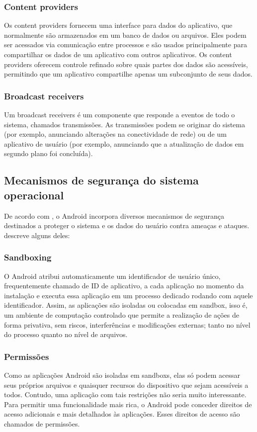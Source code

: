     \subsubsection{Content providers}
    Os content providers fornecem uma interface para dados do aplicativo, que normalmente são armazenados em um banco de dados ou arquivos. Eles podem ser acessados via comunicação entre processos e são usados principalmente para compartilhar os dados de um aplicativo com outros aplicativos. Os content providers oferecem controle refinado sobre quais partes dos dados são acessíveis, permitindo que um aplicativo compartilhe apenas um subconjunto de seus dados.
    
    \subsubsection{Broadcast receivers}
    Um broadcast receivers é um componente que responde a eventos de todo o sistema, chamados transmissões. As transmissões podem se originar do sistema (por exemplo, anunciando alterações na conectividade de rede) ou de um aplicativo de usuário (por exemplo, anunciando que a atualização de dados em segundo plano foi concluída).
    
    \subsection{Mecanismos de segurança do sistema operacional}
    \label{mecanismos}
    De acordo com , o Android incorpora diversos mecanismos de segurança destinados a proteger o sistema e os dados do usuário contra ameaças e ataques.  descreve alguns deles: 

    \subsubsection{Sandboxing}
    O Android atribui automaticamente um identificador de usuário único, frequentemente chamado de ID de aplicativo, a cada aplicação no momento da instalação e executa essa aplicação em um processo dedicado rodando com aquele identificador. Assim, as aplicações são isoladas ou colocadas em sandbox, isso é, um ambiente de computação controlado que permite a realização de ações de forma privativa, sem riscos, interferências e modificações externas; tanto no nível do processo quanto no nível de arquivos. 
    
    \subsubsection{Permissões}
    Como as aplicações Android são isoladas em sandboxs, elas só podem acessar seus próprios arquivos e quaisquer recursos do dispositivo que sejam acessíveis a todos. Contudo, uma aplicação com tais restrições não seria muito interessante. Para permitir uma funcionalidade mais rica, o Android pode conceder direitos de acesso adicionais e mais detalhados às aplicações. Esses direitos de acesso são chamados de permissões.

